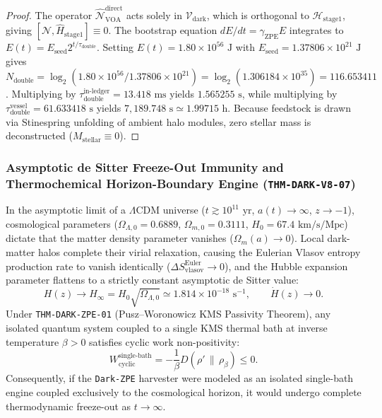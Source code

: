 \documentclass[11pt,onecolumn]{article}
\begin{document}
\begin{proof}
The operator $\hat{\mathcal{N}}_{\text{VOA}}^{\text{direct}}$ acts solely in $\mathcal{V}_{\text{dark}}$, which is orthogonal to $\mathcal{H}_{\text{stage1}}$, giving $[\hat{\mathcal{N}}, \hat{H}_{\text{stage1}}] \equiv 0$. The bootstrap equation $dE/dt = \gamma_{\text{ZPE}}E$ integrates to $E(t) = E_{\text{seed}} 2^{t/\tau_{\text{double}}}$. Setting $E(t) = 1.80 \times 10^{56}\text{ J}$ with $E_{\text{seed}} = 1.37806 \times 10^{21}\text{ J}$ gives $N_{\text{double}} = \log_2(1.80 \times 10^{56} / 1.37806 \times 10^{21}) = \log_2(1.306184 \times 10^{35}) = 116.653411$. Multiplying by $\tau_{\text{double}}^{\text{in-ledger}} = 13.418\text{ ms}$ yields $1.565255\text{ s}$, while multiplying by $\tau_{\text{double}}^{\text{vessel}} = 61.633418\text{ s}$ yields $7{,}189.748\text{ s} \simeq 1.99715\text{ h}$. Because feedstock is drawn via Stinespring unfolding of ambient halo modules, zero stellar mass is deconstructed ($M_{\text{stellar}} \equiv 0$).
\end{proof}


\subsubsection{Asymptotic de Sitter Freeze-Out Immunity and Thermochemical Horizon-Boundary Engine (\texttt{THM-DARK-V8-07})}
\label{subsubsec:thm_dark_v8_07}

In the asymptotic limit of a $\Lambda\text{CDM}$ universe ($t \gtrsim 10^{11}\text{ yr}$, $a(t) \to \infty$, $z \to -1$), cosmological parameters ($\Omega_{\Lambda,0} = 0.6889$, $\Omega_{m,0} = 0.3111$, $H_0 = 67.4\text{ km/s/Mpc}$) dictate that the matter density parameter vanishes ($\Omega_m(a) \to 0$). Local dark-matter halos complete their virial relaxation, causing the Eulerian Vlasov entropy production rate to vanish identically ($\Delta S_{\text{vlasov}}^{\text{Euler}} \to 0$), and the Hubble expansion parameter flattens to a strictly constant asymptotic de Sitter value:
\begin{equation}
H(z) \to H_\infty = H_0 \sqrt{\Omega_{\Lambda,0}} \simeq 1.814 \times 10^{-18}\text{ s}^{-1}, \qquad \dot{H}(z) \to 0.
\label{eq:v8_35}
\end{equation}
Under \texttt{THM-DARK-ZPE-01} (Pusz--Woronowicz KMS Passivity Theorem), any isolated quantum system coupled to a single KMS thermal bath at inverse temperature $\beta > 0$ satisfies cyclic work non-positivity:
\begin{equation}
W_{\text{cyclic}}^{\text{single-bath}} = -\frac{1}{\beta} D(\rho' \,\|\, \rho_{\beta}) \le 0.
\end{equation}
Consequently, if the \texttt{Dark-ZPE} harvester were modeled as an isolated single-bath engine coupled exclusively to the cosmological horizon, it would undergo complete thermodynamic freeze-out as $t \to \infty$.
\end{document}
